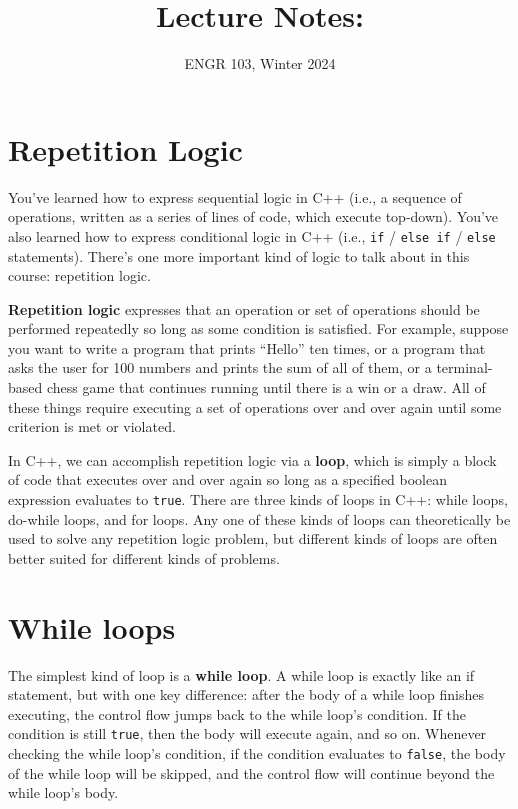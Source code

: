 \documentclass{article}
\title{
    Lecture Notes: \lecturetitle
}
\author{ENGR 103, Winter 2024}
\date{}
\begin{document}
\maketitle

\section{Repetition Logic}

You've learned how to express sequential logic in C++ (i.e., a sequence of operations, written as a series of lines of code, which execute top-down). You've also learned how to express conditional logic in C++ (i.e., \texttt{if} / \texttt{else if} / \texttt{else} statements). There's one more important kind of logic to talk about in this course: repetition logic.

\textbf{Repetition logic} expresses that an operation or set of operations should be performed repeatedly so long as some condition is satisfied. For example, suppose you want to write a program that prints ``Hello'' ten times, or a program that asks the user for 100 numbers and prints the sum of all of them, or a terminal-based chess game that continues running until there is a win or a draw. All of these things require executing a set of operations over and over again until some criterion is met or violated.

In C++, we can accomplish repetition logic via a \textbf{loop}, which is simply a block of code that executes over and over again so long as a specified boolean expression evaluates to \texttt{true}. There are three kinds of loops in C++: while loops, do-while loops, and for loops. Any one of these kinds of loops can theoretically be used to solve any repetition logic problem, but different kinds of loops are often better suited for different kinds of problems.

\section{While loops}

The simplest kind of loop is a \textbf{while loop}. A while loop is exactly like an if statement, but with one key difference: after the body of a while loop finishes executing, the control flow jumps back to the while loop's condition. If the condition is still \texttt{true}, then the body will execute again, and so on. Whenever checking the while loop's condition, if the condition evaluates to \texttt{false}, the body of the while loop will be skipped, and the control flow will continue beyond the while loop's body.
\end{document}
